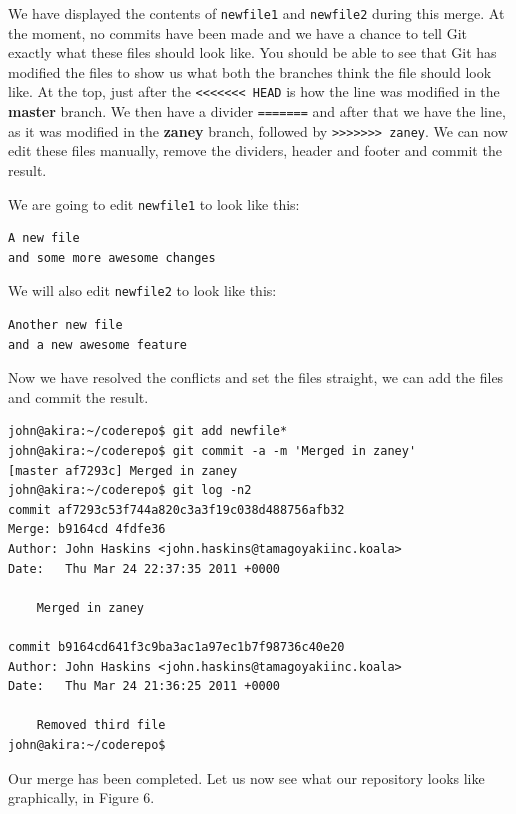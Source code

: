 We have displayed the contents of \texttt{newfile1} and \texttt{newfile2} during this merge.  At the moment, no commits have been made and we have a chance to tell Git exactly what these files should look like.  You should be able to see that Git has modified the files to show us what both the branches think the file should look like.  At the top, just after the \texttt{<<<<<<< HEAD} is how the line was modified in the \textbf{master} branch.  We then have a divider \texttt{=======} and after that we have the line, as it was modified in the \textbf{zaney} branch, followed by \texttt{>>>>>>> zaney}.  We can now edit these files manually, remove the dividers, header and footer and commit the result.  

We are going to edit \texttt{newfile1} to look like this:

\begin{Verbatim}[frame=leftline,framerule=1mm,fontsize=\relsize{-3}] 
A new file
and some more awesome changes
\end{Verbatim}

We will also edit \texttt{newfile2} to look like this:

\begin{Verbatim}[frame=leftline,framerule=1mm,fontsize=\relsize{-3}] 
Another new file
and a new awesome feature
\end{Verbatim}

Now we have resolved the conflicts and set the files straight, we can add the files and commit the result.

\begin{Verbatim}[frame=leftline,framerule=1mm,fontsize=\relsize{-3}] 
john@akira:~/coderepo$ git add newfile*
john@akira:~/coderepo$ git commit -a -m 'Merged in zaney'
[master af7293c] Merged in zaney
john@akira:~/coderepo$ git log -n2
commit af7293c53f744a820c3a3f19c038d488756afb32
Merge: b9164cd 4fdfe36
Author: John Haskins <john.haskins@tamagoyakiinc.koala>
Date:   Thu Mar 24 22:37:35 2011 +0000

    Merged in zaney

commit b9164cd641f3c9ba3ac1a97ec1b7f98736c40e20
Author: John Haskins <john.haskins@tamagoyakiinc.koala>
Date:   Thu Mar 24 21:36:25 2011 +0000

    Removed third file
john@akira:~/coderepo$ 

\end{Verbatim}

Our merge has been completed.  Let us now see what our repository looks like graphically, in Figure 6.

